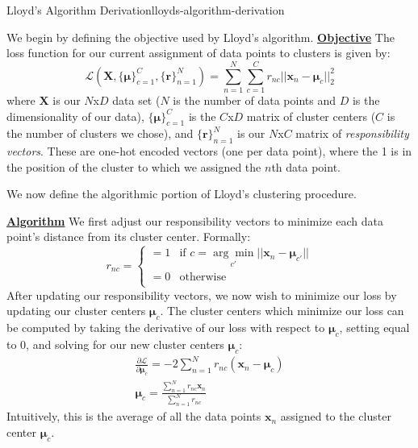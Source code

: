 \begin{derivation}{Lloyd's Algorithm Derivation}{lloyds-algorithm-derivation} \newline
	
	We begin by defining the objective used by Lloyd's algorithm. \newline \newline
	\underline{\textbf{Objective}} \newline
	The loss function for our current assignment of data points to clusters is given by:
	\begin{equation} \label{clustering-loss-fn}
		\mathcal{L}(\textbf{X}, \big\{\boldsymbol{\mu}\big\}_{c=1}^{C}, \big\{\textbf{r}\big\}_{n=1}^{N}) = \sum_{n=1}^{N} \sum_{c=1}^{C} r_{nc} ||\textbf{x}_{n} - \boldsymbol{\mu}_{c}||_2^{2}
	\end{equation}
	where $\textbf{X}$ is our $N$x$D$ data set ($N$ is the number of data points and $D$ is the dimensionality of our data), $\big\{\boldsymbol{\mu}\big\}_{c=1}^{C}$ is the $C$x$D$ matrix of cluster centers ($C$ is the number of clusters we chose), and $\big\{\textbf{r}\big\}_{n=1}^{N}$ is our $N$x$C$ matrix of \textit{responsibility vectors}. These are one-hot encoded vectors (one per data point), where the 1 is in the position of the cluster to which we assigned the $n$th data point. \newline

	We now define the algorithmic portion of Lloyd's clustering procedure. \newline

	\underline{\textbf{Algorithm}} \newline
	We first adjust our responsibility vectors to minimize each data point's distance from its cluster center. Formally:
	\begin{equation} \label{responsibility-vector-update}
		r_{nc} = \begin{cases}
		 	= 1 & \text{if $c = \underset{c'}{\arg\min} ||\textbf{x}_{n} - \boldsymbol{\mu}_{c'}||$} \\
			= 0 & \text{otherwise} \\
		\end{cases}
	\end{equation}
	After updating our responsibility vectors, we now wish to minimize our loss by updating our cluster centers $\boldsymbol{\mu}_{c}$. The cluster centers which minimize our loss can be computed by taking the derivative of our loss with respect to $\boldsymbol{\mu}_{c}$, setting equal to 0, and solving for our new cluster centers $\boldsymbol{\mu}_{c}$:
	\begin{equation} \label{update-cluster-centers}
		\begin{aligned}
			\frac{\partial \mathcal{L}}{\partial \boldsymbol{\mu}_{c}} = -2 \sum_{n=1}^{N} r_{nc} (\textbf{x}_{n} - \boldsymbol{\mu}_{c}) \\
			\boldsymbol{\mu}_{c} = \frac{\sum_{n=1}^{N} r_{nc} \textbf{x}_{n}}{\sum_{n=1}^{N} r_{nc}}
		\end{aligned}
	\end{equation}
	Intuitively, this is the average of all the data points $\textbf{x}_{n}$ assigned to the cluster center $\boldsymbol{\mu}_{c}$. \newline


\end{derivation}
